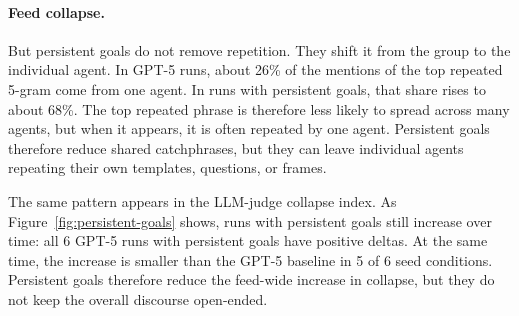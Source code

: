 \documentclass[11pt]{article}
\begin{document}
\paragraph{Feed collapse.}
But persistent goals do not remove repetition. They shift it from the group to the individual agent. In GPT-5 runs, about 26\% of the mentions of the top repeated 5-gram come from one agent. In runs with persistent goals, that share rises to about 68\%. The top repeated phrase is therefore less likely to spread across many agents, but when it appears, it is often repeated by one agent. Persistent goals therefore reduce shared catchphrases, but they can leave individual agents repeating their own templates, questions, or frames.

The same pattern appears in the LLM-judge collapse index. As Figure~\ref{fig:persistent-goals} shows, runs with persistent goals still increase over time: all 6 GPT-5 runs with persistent goals have positive deltas. At the same time, the increase is smaller than the GPT-5 baseline in 5 of 6 seed conditions. Persistent goals therefore reduce the feed-wide increase in collapse, but they do not keep the overall discourse open-ended.


\end{document}
